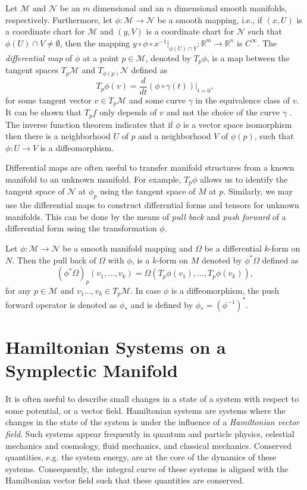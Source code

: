 Let $\mathcal M$ and $\mathcal N$ be an $m$ dimensional and an $n$ dimensional smooth manifolds, respectively. Furthermore, let $\phi:\mathcal M\to \mathcal N$ be a smooth mapping, i.e., if $(x,U)$ is a coordinate chart for $\mathcal M$ and $(y,V)$ is a coordinate chart for $\mathcal N$ such that $\phi(U)\cap V\neq \emptyset$, then the mapping $y\circ \phi \circ x^{-1}|_{\phi(U)\cap V}:\mathbb R^{m}\to \mathbb R^{n}$ is $C^{\infty}$. The \emph{differential map} of $\phi$ at a point $p\in \mathcal M$, denoted by $T_{p}\phi$, is a map between the tangent spaces $T_p \mathcal M$ and $T_{\phi(p)} \mathcal N$ defined as
\begin{equation} \label{eq:2.4}
	T_p \phi(v) = \frac{d}{dt}(\phi\circ \gamma(t))|_{t=0},
\end{equation}
for some tangent vector $v\in T_{p} \mathcal M$ and some curve $\gamma$ in the equivalence class of $v$. It can be shown that $T_p f$ only depends of $v$ and not the choice of the curve $\gamma$ \cite{robbin2011introduction}. The inverse function theorem \cite{rudin1976principles} indicates that if $\phi$ is a vector space isomorphism then there is a neighborhood $U$ of $p$ and a neighborhood $V$ of $\phi(p)$, such that $\phi:U\to V$ is a diffeomorphism.

Differential maps are often useful to transfer manifold structures from a known manifold to an unknown manifold. For example, $T_p\phi$ allows us to identify the tangent space of $\mathcal N$ at $\phi_p$ using the tangent space of $M$ at $p$. Similarly, we may use the differential maps to construct differential forms and tensors for unknown manifolds. This can be done by the means of \emph{pull back} and \emph{push forward} of a differential form using the transformation $\phi$.

\begin{definition}
Let $\phi:\mathcal M \to \mathcal N$ be a smooth manifold mapping and $\Omega$ be a differential $k$-form on $N$. Then the pull back of $\Omega$ with $\phi$, is a $k$-form on $M$ denoted by $\phi^*\Omega$ defined as
\[
	(\phi^*\Omega)_p(v_1,\dots,v_k) = \Omega( T_p\phi(v_1) , \dots , T_p\phi(v_k) ),
\]
for any $p\in \mathcal M$ and $v_1\dots,v_k \in T_p \mathcal M$. In case $\phi$ is a diffeomorphism, the push forward operator is denoted as $\phi_*$ and is defined by $\phi_* = (\phi^{-1})^*$.
\end{definition}

\section{Hamiltonian Systems on a Symplectic Manifold}
It is often useful to describe small changes in a state of a system with respect to some potential, or a vector field. Hamiltonian systems are systems where the changes in the state of the system is under the influence of a \emph{Hamiltonian vector field}. Such systems appear frequently in quantum and particle physics, celestial mechanics and cosmology, fluid mechanics, and classical mechanics. Conserved quantities, e.g. the system energy, are at the core of the dynamics of these systems. Consequently, the integral curve of these systems is aligned with the Hamiltonian vector field such that these quantities are conserved.

